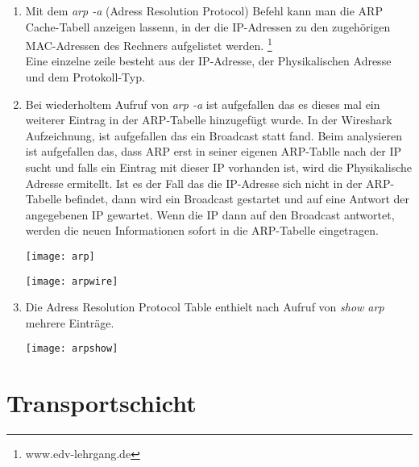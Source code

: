 \documentclass{scrartcl}
\begin{document}
  \renewcommand{\labelenumi}{\alph{enumi})}
  \begin{enumerate}
  \item
  Mit dem \textit{arp -a} (Adress Resolution Protocol) Befehl kann man die ARP Cache-Tabell anzeigen lassenn, in der die IP-Adressen zu den zugehörigen MAC-Adressen des Rechners aufgelistet werden. \footnote{www.edv-lehrgang.de}\\
  Eine einzelne zeile besteht aus der IP-Adresse, der Physikalischen Adresse und dem Protokoll-Typ.
  
  \item
  Bei wiederholtem Aufruf von \textit{arp -a} ist aufgefallen das es dieses mal ein weiterer Eintrag in der ARP-Tabelle hinzugefügt wurde. In der Wireshark Aufzeichnung, ist aufgefallen das ein Broadcast statt fand. Beim analysieren ist aufgefallen das, dass ARP erst in seiner eigenen ARP-Tablle nach der IP sucht und falls ein Eintrag mit dieser IP vorhanden ist, wird die Physikalische Adresse ermitellt. Ist es der Fall das die IP-Adresse sich nicht in der ARP-Tabelle befindet, dann wird ein Broadcast gestartet und auf eine Antwort der angegebenen IP gewartet. Wenn die IP dann auf den Broadcast antwortet, werden die neuen Informationen sofort in die ARP-Tabelle eingetragen.
  
   \texttt{[image: arp]}
   \label{fig:arp}

   \texttt{[image: arpwire]}
   \label{fig:arpwire}

  \item
  Die Adress Resolution Protocol Table enthielt nach Aufruf von \textit{show arp} mehrere Einträge.
  
   \texttt{[image: arpshow]}
   \label{fig:arpshow}
  \end{enumerate}    

  \newpage
\section[Versuch 6 Transportschicht]{Transportschicht}
\end{document}
